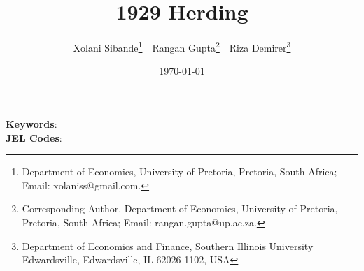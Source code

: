 
\title{1929 Herding}


\author { Xolani Sibande\footnote{Department of Economics, University of Pretoria, Pretoria, South Africa; Email: xolaniss@gmail.com.} \,\, 
Rangan Gupta\footnote{Corresponding Author. Department of Economics, University of Pretoria, Pretoria, South Africa; Email: rangan.gupta@up.ac.za.} \,\,
Riza Demirer\footnote{Department of Economics and Finance, Southern Illinois University Edwardsville, Edwardsville, IL 62026-1102, USA}}
\date{\today}
\maketitle

\begin{abstract}


\end{abstract}

\noindent\textbf{Keywords}:   \\
\textbf{JEL Codes}: 
\newpage